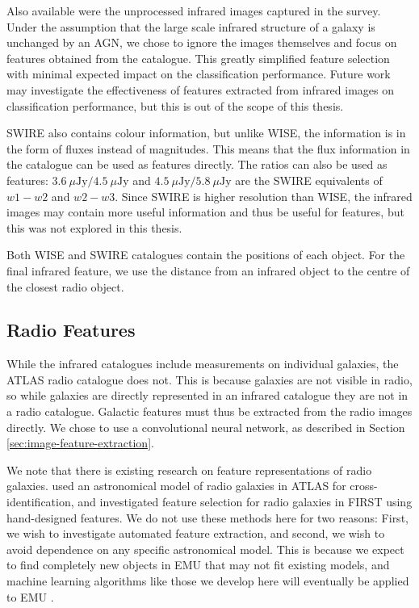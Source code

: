     Also available were the unprocessed infrared images captured in the survey.
    Under the assumption that the large scale infrared structure of a galaxy is
    unchanged by an AGN, we chose to ignore the images themselves and focus on
    features obtained from the catalogue. This greatly simplified feature
    selection with minimal expected impact on the classification performance.
    Future work may investigate the effectiveness of features extracted from
    infrared images on classification performance, but this is out of the scope
    of this thesis.

    SWIRE also contains colour information, but unlike WISE, the information is
    in the form of fluxes instead of magnitudes. This means that the flux
    information in the catalogue can be used as features directly. The ratios
    can also be used as features: $3.6\ \mu\text{Jy} / 4.5\ \mu\text{Jy}$ and $4.5\
    \mu\text{Jy} / 5.8\ \mu\text{Jy}$ are the SWIRE equivalents of $w1 - w2$ and
    $w2 - w3$. Since SWIRE is higher resolution than WISE, the infrared images
    may contain more useful information and thus be useful for features, but
    this was not explored in this thesis.

    Both WISE and SWIRE catalogues contain the positions of each object. For the
    final infrared feature, we use the distance from an infrared object to the
    centre of the closest radio object.

  \subsection{Radio Features}
  \label{sec:radio-features}

    While the infrared catalogues include measurements on individual galaxies,
    the ATLAS radio catalogue does not. This is because galaxies are not
    visible in radio, so while galaxies are directly represented in an infrared
    catalogue they are not in a radio catalogue. Galactic features must thus be
    extracted from the radio images directly. We chose to use a convolutional
    neural network, as described in Section \ref{sec:image-feature-extraction}.

    We note that there is existing research on feature representations of radio
    galaxies. \citet{fan15} used an astronomical model of radio galaxies in
    ATLAS for cross-identification, and \citet{proctor06} investigated feature
    selection for radio galaxies in FIRST using hand-designed features. We do
    not use these methods here for two reasons: First, we wish to investigate
    automated feature extraction, and second, we wish to avoid dependence on any
    specific astronomical model. This is because we expect to find completely
    new objects in EMU that may not fit existing models, and machine learning
    algorithms like those we develop here will eventually be applied to EMU
    \citep{banfield15}.

